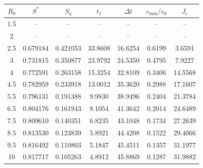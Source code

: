\begin{tabular}{ccccccc}
\toprule
$R_0$ & $S^*$ & $S_q$ & $t_1$ & $\Delta t$ & $c_{\min}/c_0$ & $J_c$ \\
\midrule
1.5 & -- & -- & -- & -- & -- & -- \\
2 & -- & -- & -- & -- & -- & -- \\
2.5 & 0.679184 & 0.421053 & 33.8608 & 16.6254 & 0.6199 & 3.6591 \\
3 & 0.731815 & 0.350877 & 23.9792 & 24.5350 & 0.4795 & 7.9227 \\
4 & 0.772591 & 0.263158 & 15.3254 & 32.8109 & 0.3406 & 14.5568 \\
4.5 & 0.782959 & 0.233918 & 13.0012 & 35.3620 & 0.2988 & 17.1607 \\
5.5 & 0.796131 & 0.191388 & 9.9830 & 38.9496 & 0.2404 & 21.3784 \\
6.5 & 0.804176 & 0.161943 & 8.1054 & 41.3642 & 0.2014 & 24.6489 \\
7.5 & 0.809610 & 0.140351 & 6.8235 & 43.1048 & 0.1734 & 27.2639 \\
8.5 & 0.813530 & 0.123839 & 5.8921 & 44.4208 & 0.1522 & 29.4066 \\
9.5 & 0.816492 & 0.110803 & 5.1847 & 45.4511 & 0.1357 & 31.1977 \\
10 & 0.817717 & 0.105263 & 4.8912 & 45.8869 & 0.1287 & 31.9882 \\
\bottomrule
\end{tabular}
